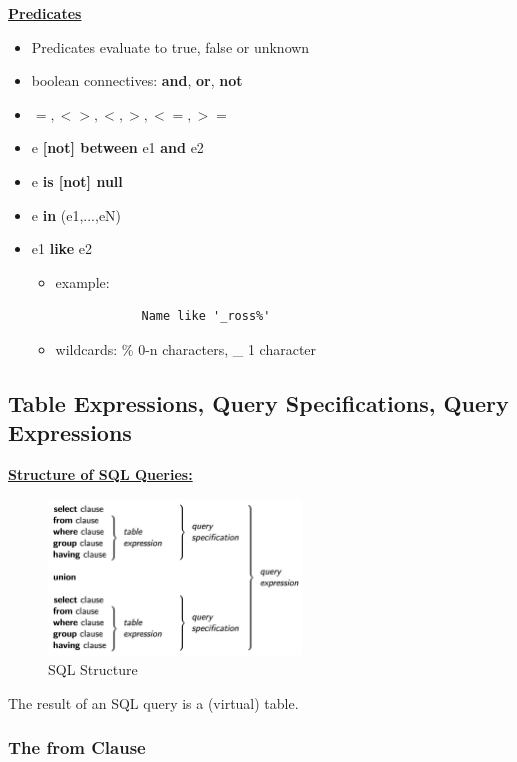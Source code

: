 \textbf{\underline{Predicates}}
\bigskip

\begin{itemize}[label=\(\rhd\)]
    \item Predicates evaluate to true, false or unknown
    \item boolean connectives: \textbf{and}, \textbf{or}, \textbf{not}
    \item $=,<>, <,>,<=,>=$
    \item e \textbf{[not] between} e1 \textbf{and} e2
    \item e \textbf{is [not] null}
    \item e \textbf{in} (e1,...,eN)
    \item e1 \textbf{like} e2
    \begin{itemize}[label=\(\rhd\)]
        \item example:
        \begin{lstlisting}
            Name like '_ross%'
        \end{lstlisting}
        \item wildcards: \% 0-n characters, \_ 1 character
    \end{itemize}
\end{itemize}



\subsection{Table Expressions, Query Specifications, Query Expressions}
\textbf{\underline{Structure of SQL Queries:}}
\bigskip

\begin{figure}[H]
\centering
\includegraphics[width=0.6\textwidth]{images/Screenshot 2024-05-04 at 16.56.14.jpg}
\caption{SQL Structure}
\end{figure}

The result of an SQL query is a (virtual) table.

\subsubsection{The from Clause}

